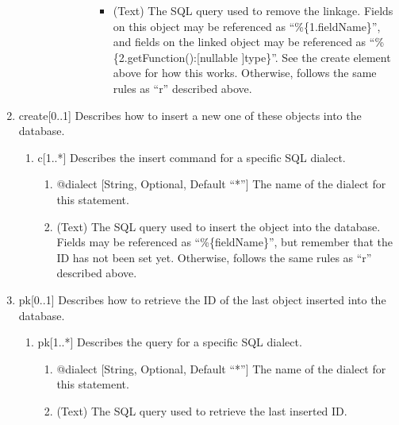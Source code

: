 \documentclass{book}
\begin{document}
\begin{enumerate}
\begin{enumerate}
\begin{enumerate}
\begin{enumerate}
\begin{itemize}
\begin{itemize}
                        \item (Text) The SQL query used to remove the linkage.
                              Fields on this object may be referenced as
                              ``\%\{1.fieldName\}'', and fields on the linked
                              object may be referenced as
                              ``\%\{2.getFunction():[nullable ]type\}''. See
                              the create element above for how this works.
                              Otherwise, follows the same rules as ``r''
                              described above.
                    \end{itemize}
                \end{itemize}
            \end{enumerate}
        \end{enumerate}
    \end{enumerate}
    \item create[0..1] Describes how to insert a new one of these objects into
          the database.
    \begin{enumerate}
        \item c[1..*] Describes the insert command for a specific SQL dialect.
        \begin{enumerate}
            \item @dialect [String, Optional, Default ``*''] The name of the
                  dialect for this statement.
            \item (Text) The SQL query used to insert the object into the
                  database. Fields may be referenced as ``\%\{fieldName\}'', but
                  remember that the ID has not been set yet. Otherwise, follows
                  the same rules as ``r'' described above.
        \end{enumerate}
    \end{enumerate}
    \item pk[0..1] Describes how to retrieve the ID of the last object inserted
          into the database.
    \begin{enumerate}
        \item pk[1..*] Describes the query for a specific SQL dialect.
        \begin{enumerate}
            \item @dialect [String, Optional, Default ``*''] The name of the
                  dialect for this statement.
            \item (Text) The SQL query used to retrieve the last inserted ID.

\end{enumerate}
\end{enumerate}
\end{enumerate}
\end{document}
